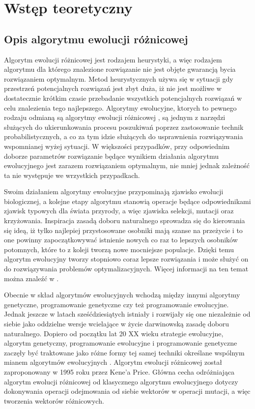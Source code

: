\chapter{Wstęp teoretyczny}\label{cha:pierwszyDokument}


\section{Opis algorytmu ewolucji różnicowej}\label{sec:strukturaDokumentu}


Algorytm ewolucji różnicowej jest rodzajem heurystyki, a więc rodzajem algorytmu dla którego znalezione rozwiązanie nie jest objęte gwarancją bycia rozwiązaniem optymalnym. Metod heurystycznych używa się w sytuacji gdy przestrzeń potencjalnych rozwiązań jest zbyt duża, iż nie jest możliwe w dostatecznie krótkim czasie przebadanie wszystkich  potencjalnych rozwiązań w celu znalezienia tego najlepszego. Algorytmy ewolucyjne, ktorych to pewnego rodzaju odmianą są algorytmy ewolucji różnicowej \cite{diff}, są jednym z narzędzi służących do ukierunkowania procesu poszukiwań poprzez zastosowanie technik probabilistycznych, a co za tym idzie służących do usprawnienia rozwiązywania wspomnianej wyżej sytuacji. W większości przypadków, przy odpowiednim doborze parametrów rozwiązanie będące wynikiem działania algorytmu ewolucyjnego jest zarazem rozwiązaniem optymalnym, nie mniej jednak zależność ta nie występuje  we wrzystkich przypadkach.

Swoim działaniem algorytmy ewolucyjne przypominają zjawisko ewolucji biologicznej, a kolejne etapy algorytmu stanowią operacje będące odpowiednikami zjawisk typowych dla świata przyrody, a więc zjawiska selekcji, mutacji oraz krzyżowania. Inspiracja zasadą doboru naturalnego sprowadza się do  kierowania się ideą, iż tylko najlepiej przystosowane osobniki mają szanse na przeżycie i to one powinny zapoczątkowywać istnienie nowych co raz to lepszych osobników potomnych, które to z koleji tworzą nowe mocniejsze populacje. Dzięki temu algorytm ewolucyjny tworzy stopniowo coraz lepsze rozwiązania i może służyć on do rozwiązywania problemów optymalizacyjnych. Więcej informacji na ten temat można znaleźć w \cite{zeszyty}.

Obecnie w skład algorytmów ewolucyjnych wchodzą między innymi algorytmy genetyczne, programowanie genetyczne czy też programowanie ewolucyjne. Jednak jeszcze w latach sześćdziesiątych istniały i rozwijały się one niezależnie od siebie jako oddzielne wersje wcielające w życie darwinowską zasadę doboru naturalnego. Dopiero od początku lat 20 XX wieku strategie ewolucyjne, algorytm genetyczny, programowanie ewolucyjne i programowanie genetyczne zaczęły być traktowane jako różne formy tej samej techniki określane wspólnym mianem algorytmów ewolucyjnych \cite{doktorat}.  Algorytm ewolucji różnicowej został zaproponowany w 1995 roku przez Kene'a Price. Główna cecha odróżniająca algorytm ewolucji różnicowej od klasycznego algorytmu ewolucyjnego dotyczy dokonywania operacji odejmowania od siebie wektorów w operacji mutacji, a więc tworzenia wektorów różnicowych.

